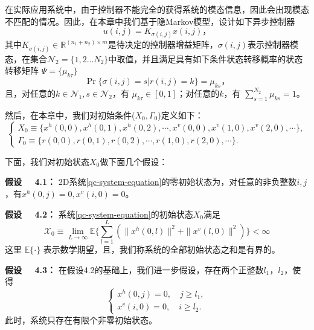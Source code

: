 	在实际应用系统中，由于控制器不能完全的获得系统的模态信息，因此会出现模态不匹配的情况。因此，在本章中我们基于隐Markov模型，设计如下异步控制器
	\begin{equation}\label{qc-controller}
	u(i,j) = K_{\sigma(i,j)}x(i,j)，
	\end{equation}
	其中$K_{\sigma(i,j)}\in \mathbb{R}^{(n_1+n_2)\times m}$是待决定的控制器增益矩阵，$\sigma(i,j)$表示控制器模态，在集合$\mathcal{N}_{2} = \{1,2...N_{2}\}$中取值，并且满足具有如下条件状态转移概率的状态转移矩阵 $\varPsi=\{\mu_{k\tau }\}$
	\begin{equation}
	\Pr\{\sigma(i,j)=s|r(i,j)=k\}=\mu_{ks }， %
	\end{equation}
	且，对任意的$k\in\mathcal{N}_{1}, s\in\mathcal{N}_{2}$，有 $\mu_{k\tau }\in[0,1]$；对任意的$k$，有  $\sum_{s =1}^{N_{2}}\mu_{ks } = 1$。
	
	然后，在本章中，我们对初始条件($X_{0},\varGamma_{0}$)定义如下：
	\begin{equation*}
		\left\{
			\begin{array}{lr}
				X_{0}\equiv \big\{x^{h}(0,0),x^{h}(0,1),x^{h}(0,2),\cdots, x^{v}(0,0),x^{v}(1,0),x^{v}(2,0),\cdots  \big\},\\
				\varGamma_{0}\equiv \big\{r(0,0), r(0,1),r(0,2),\cdots,r(1,0),r(2,0),\cdots \big\}.
			\end{array}
		\right.
	\end{equation*}
	
	下面，我们对初始状态$X_{0}$做下面几个假设：
	
	{\bf 假设 \ \ 4.1：}
	2D系统\eqref{qc-system-equation}的零初始状态为，对任意的非负整数$i,j$，有$x^{h}(0,j) =0, x^{v}(i,0)=0$。
	
	{\bf 假设 \ \ 4.2：}
	系统\eqref{qc-system-equation}的初始状态$X_{0}$满足
	\begin{equation}
	\mathscr{X}_{0} \equiv \lim\limits_{L\to\infty}\mathbb{E}\Big\{\sum_{l=1}^{L}(\|x^{h}(0,l)\|^{2}+ \|x^{v}(l,0)\|^{2})\Big\} < \infty
	\end{equation}
	这里 $\mathbb{E}\{\cdot\}$ 表示数学期望，且，我们称系统的全部初始状态之和是有界的。
	
	{\bf 假设 \ \ 4.3：}
	在假设4.2的基础上，我们进一步假设，存在两个正整数$l_1$，$l_2$，使得
	\begin{equation}
		\left\{
		\begin{array}{lr}
		x^{h}(0,j)=0,\quad j\geq l_1,\\
		x^{v}(i,0)=0,\quad i\geq l_2.
		\end{array}
		\right.
	\end{equation}
	此时，系统只存在有限个非零初始状态。
	
